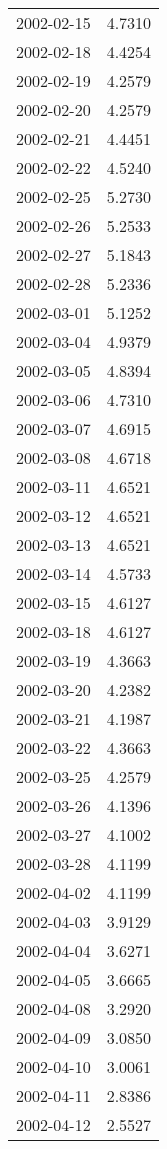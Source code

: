 \begin{tabular}{lr}
2002-02-15 &      4.7310 \\
2002-02-18 &      4.4254 \\
2002-02-19 &      4.2579 \\
2002-02-20 &      4.2579 \\
2002-02-21 &      4.4451 \\
2002-02-22 &      4.5240 \\
2002-02-25 &      5.2730 \\
2002-02-26 &      5.2533 \\
2002-02-27 &      5.1843 \\
2002-02-28 &      5.2336 \\
2002-03-01 &      5.1252 \\
2002-03-04 &      4.9379 \\
2002-03-05 &      4.8394 \\
2002-03-06 &      4.7310 \\
2002-03-07 &      4.6915 \\
2002-03-08 &      4.6718 \\
2002-03-11 &      4.6521 \\
2002-03-12 &      4.6521 \\
2002-03-13 &      4.6521 \\
2002-03-14 &      4.5733 \\
2002-03-15 &      4.6127 \\
2002-03-18 &      4.6127 \\
2002-03-19 &      4.3663 \\
2002-03-20 &      4.2382 \\
2002-03-21 &      4.1987 \\
2002-03-22 &      4.3663 \\
2002-03-25 &      4.2579 \\
2002-03-26 &      4.1396 \\
2002-03-27 &      4.1002 \\
2002-03-28 &      4.1199 \\
2002-04-02 &      4.1199 \\
2002-04-03 &      3.9129 \\
2002-04-04 &      3.6271 \\
2002-04-05 &      3.6665 \\
2002-04-08 &      3.2920 \\
2002-04-09 &      3.0850 \\
2002-04-10 &      3.0061 \\
2002-04-11 &      2.8386 \\
2002-04-12 &      2.5527 \\

\end{tabular}
